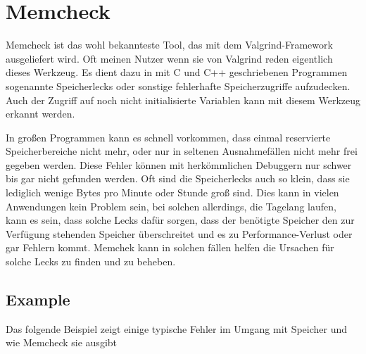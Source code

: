 \section{Memcheck}
Memcheck ist das wohl bekannteste Tool, das mit dem Valgrind-Framework ausgeliefert wird. Oft meinen Nutzer wenn sie von Valgrind reden eigentlich dieses Werkzeug. Es dient dazu in mit C und C++ geschriebenen Programmen sogenannte Speicherlecks oder sonstige fehlerhafte Speicherzugriffe aufzudecken. Auch der Zugriff auf noch nicht initialisierte Variablen kann mit diesem Werkzeug erkannt werden.

In großen Programmen kann es schnell vorkommen, dass einmal reservierte Speicherbereiche nicht mehr, oder nur in seltenen Ausnahmefällen nicht mehr frei gegeben werden. Diese Fehler können mit herkömmlichen Debuggern nur schwer bis gar nicht gefunden werden. Oft sind die Speicherlecks auch so klein, dass sie lediglich wenige Bytes pro Minute oder Stunde groß sind. Dies kann in vielen Anwendungen kein Problem sein, bei solchen allerdings, die Tagelang laufen, kann es sein, dass solche Lecks dafür sorgen, dass der benötigte Speicher den zur Verfügung stehenden Speicher überschreitet und es zu Performance-Verlust oder gar Fehlern kommt. Memchek kann in solchen fällen helfen die Ursachen für solche Lecks zu finden und zu beheben.

\subsection{Example}
Das folgende Beispiel zeigt einige typische Fehler im Umgang mit Speicher und wie Memcheck sie ausgibt



